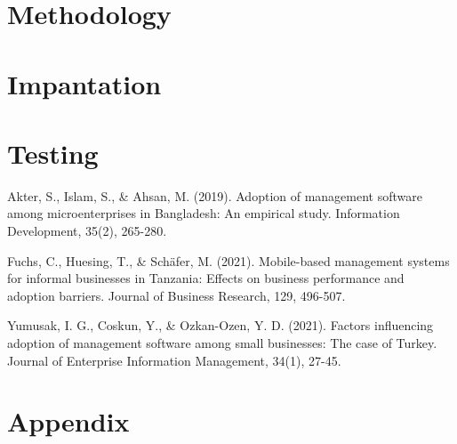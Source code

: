 \documentclass{article}
\begin{document}
\newpage

\section*{Methodology}
\lipsum[1-2]
\newpage


\section*{Impantation}
\lipsum[1-2]
\newpage


\section*{Testing}
\lipsum[1-2]
\newpage



\begin{thebibliography}{10}
	

	Akter, S., Islam, S., \& Ahsan, M. (2019). Adoption of management software among microenterprises in Bangladesh: An empirical study. Information Development, 35(2), 265-280.

	Fuchs, C., Huesing, T., \& Schäfer, M. (2021). Mobile-based management systems for informal businesses in Tanzania: Effects on business performance and adoption barriers. Journal of Business Research, 129, 496-507.

	Yumusak, I. G., Coskun, Y., \& Ozkan-Ozen, Y. D. (2021). Factors influencing adoption of management software among small businesses: The case of Turkey. Journal of Enterprise Information Management, 34(1), 27-45.

\end{thebibliography}


\newpage

\section{Appendix}
\lipsum[1-2]
\newpage
\end{document}

